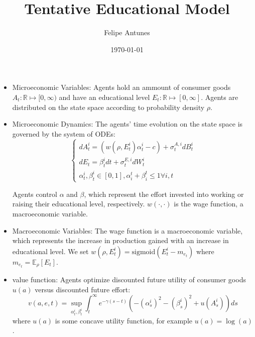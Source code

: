 \documentclass{article}
\title{Tentative Educational Model}
\author{Felipe Antunes}
\date{\today}
\begin{document}
\maketitle

\begin{itemize}
    \item Microeconomic Variables: Agents hold an ammount of consumer goods
     $A_t:\mathbb{R} \mapsto [0,\infty)$ 
     and have an educational level 
     $E_t: \mathbb{R} \mapsto [0,\infty]$. 
    Agents are distributed on the state space according to probability density
     $\rho$.
    \item Microeconomic Dynamics: The agents' time evolution on the state space 
    is governed by the system of ODEs:
    \begin{equation}
        \begin{cases}
            d A_t^i = \left( w(\rho, E^i_t)\alpha_t^i - c  \right) + \sigma^{A,i}_t dB^i_t\\
            d E_t = \beta^i_t dt + \sigma^{E,i}_t d W_t^i \\
            \alpha^i_t, \beta^i_t \in [0,1], \alpha_i^t + \beta_i^t \leq 1 \forall i, t
        \end{cases}
    \end{equation}

    Agents control $\alpha$ and $\beta$, which represent the effort invested 
    into working or raising their educational level, respectively. 
    $w(\cdot, \cdot)$ is the wage function,
    a macroeconomic variable.

    \item Macroeconomic Variables: The wage function is a macroeconomic variable, 
    which represents the increase in production gained with an increase in 
    educational level.
    We set 
    $w(\rho, E^i_t) = \text{sigmoid}(E^i_t - m_{e_t})$ 
    where
    $m_{e_t} = \mathbb{E}_\rho [E_t].$
    \item value function: Agents optimize discounted future utility
     of consumer goods $u(a)$ versus discounted future effort:
    \begin{equation}
        v(a,e,t) = \sup_{\alpha^i_t, \beta^i_t} \int_t^\infty e^{- \gamma (s - t)} \left( - (\alpha_s^i)^2 - (\beta_s^i)^2 + u(A_s^i) \right) ds
    \end{equation}
    where $u(a)$ is some concave utility function, for example $u(a) = \log(a)$.


\end{itemize}
\end{document}
